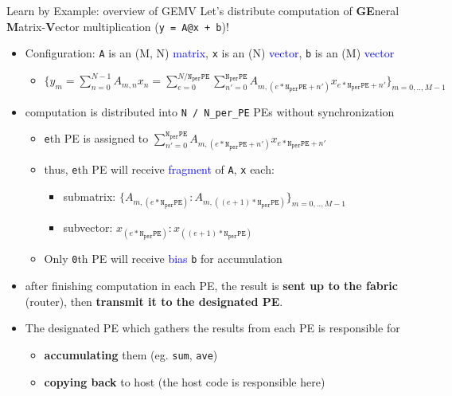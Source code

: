 \documentclass[dvipdfmx, 11pt, aspectratio=169]{beamer}   %
\begin{document}
\begin{frame}{Learn by Example: overview of GEMV}
Let's distribute computation of \textbf{GE}neral \textbf{M}atrix-\textbf{V}ector multiplication (\lstinline|y = A@x + b|)!
\begin{itemize}
    \item Configuration: \lstinline|A| is an (M, N) \textcolor{blue}{matrix}, \lstinline|x| is an (N) \textcolor{blue}{vector}, \lstinline|b| is an (M) \textcolor{blue}{vector}
    \begin{itemize}
        \item $\{y_m = \sum_{n=0}^{N-1}A_{m,n}x_n = \sum_{e=0}^{N/\mathtt{N_{per}PE}}\sum_{n'=0}^{\mathtt{N_{per}PE}}A_{m,(e*\mathtt{N_{per}PE}+n')}x_{e*\mathtt{N_{per}PE}+n'}\}_{m=0,.., M-1}$
    \end{itemize}
    \item computation is distributed into \lstinline|N / N_per_PE| PEs without synchronization
    \begin{itemize}
        \item \lstinline|e|th PE is assigned to $\sum_{n'=0}^{\mathtt{N_{per}PE}}A_{m,(e*\mathtt{N_{per}PE}+n')}x_{e*\mathtt{N_{per}PE}+n'}$
        \item thus, \lstinline|e|th PE will receive \textcolor{blue}{fragment} of \lstinline|A|, \lstinline|x| each:
        \begin{itemize}
            \item submatrix: $\{A_{m,(e*\mathtt{N_{per}PE})}:A_{m,((e+1)*\mathtt{N_{per}PE})}\}_{m=0, .., M-1}$
            \item subvector: $x_{(e*\mathtt{N_{per}PE})}:x_{((e+1)*\mathtt{N_{per}PE})}$
        \end{itemize}
        \item Only \lstinline|0|th PE will receive \textcolor{blue}{bias} \lstinline|b| for accumulation
    \end{itemize}
    \item after finishing computation in each PE, the result is \textbf{sent up to the fabric} (router), then \textbf{transmit it to the designated PE}.
    \item The designated PE which gathers the results from each PE is responsible for 
    \begin{itemize}
        \item \textbf{accumulating} them (eg. \lstinline|sum|, \lstinline|ave|)
        \item \textbf{copying back} to host (the host code is responsible here)
    \end{itemize}
\end{itemize}
\end{frame}
\end{document}
